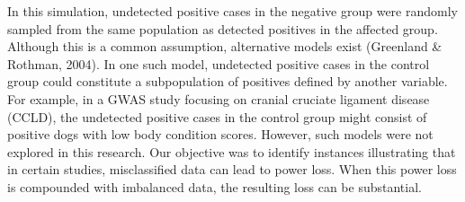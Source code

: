 \documentclass[
]{article}
\begin{document}
In this simulation, undetected positive cases in the negative group were
randomly sampled from the same population as detected positives in the
affected group. Although this is a common assumption, alternative models
exist (Greenland \& Rothman, 2004). In one such model, undetected
positive cases in the control group could constitute a subpopulation of
positives defined by another variable. For example, in a GWAS study
focusing on cranial cruciate ligament disease (CCLD), the undetected
positive cases in the control group might consist of positive dogs with
low body condition scores. However, such models were not explored in
this research. Our objective was to identify instances illustrating that
in certain studies, misclassified data can lead to power loss. When this
power loss is compounded with imbalanced data, the resulting loss can be
substantial.

\newpage




\end{document}
